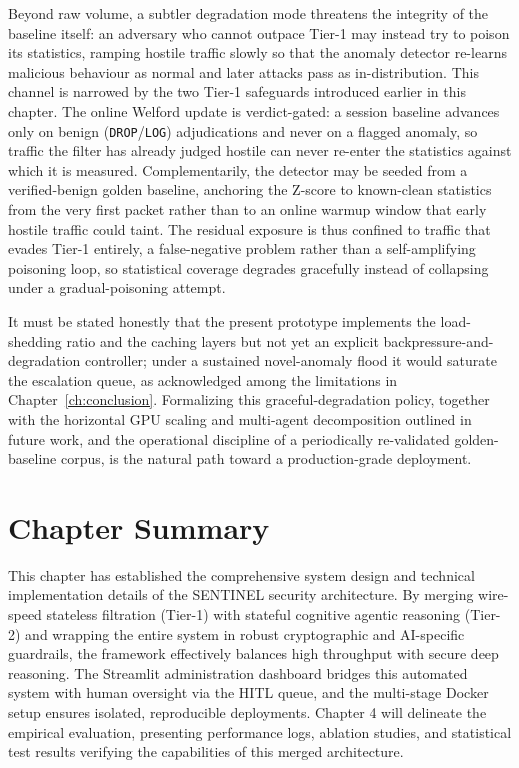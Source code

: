 Beyond raw volume, a subtler degradation mode threatens the integrity of the baseline itself: an adversary who cannot outpace Tier-1 may instead try to poison its statistics, ramping hostile traffic slowly so that the anomaly detector re-learns malicious behaviour as normal and later attacks pass as in-distribution. This channel is narrowed by the two Tier-1 safeguards introduced earlier in this chapter. The online Welford update is verdict-gated: a session baseline advances only on benign (\texttt{DROP}/\texttt{LOG}) adjudications and never on a flagged anomaly, so traffic the filter has already judged hostile can never re-enter the statistics against which it is measured. Complementarily, the detector may be seeded from a verified-benign golden baseline, anchoring the Z-score to known-clean statistics from the very first packet rather than to an online warmup window that early hostile traffic could taint. The residual exposure is thus confined to traffic that evades Tier-1 entirely, a false-negative problem rather than a self-amplifying poisoning loop, so statistical coverage degrades gracefully instead of collapsing under a gradual-poisoning attempt.

It must be stated honestly that the present prototype implements the load-shedding ratio and the caching layers but not yet an explicit backpressure-and-degradation controller; under a sustained novel-anomaly flood it would saturate the escalation queue, as acknowledged among the limitations in Chapter~\ref{ch:conclusion}. Formalizing this graceful-degradation policy, together with the horizontal GPU scaling and multi-agent decomposition outlined in future work, and the operational discipline of a periodically re-validated golden-baseline corpus, is the natural path toward a production-grade deployment.

\section{Chapter Summary}

This chapter has established the comprehensive system design and technical implementation details of the SENTINEL security architecture. By merging wire-speed stateless filtration (Tier-1) with stateful cognitive agentic reasoning (Tier-2) and wrapping the entire system in robust cryptographic and AI-specific guardrails, the framework effectively balances high throughput with secure deep reasoning. The Streamlit administration dashboard bridges this automated system with human oversight via the HITL queue, and the multi-stage Docker setup ensures isolated, reproducible deployments. Chapter 4 will delineate the empirical evaluation, presenting performance logs, ablation studies, and statistical test results verifying the capabilities of this merged architecture.
